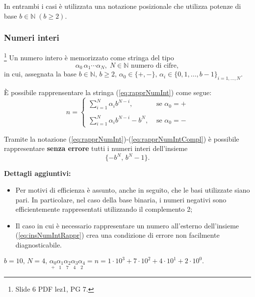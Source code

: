 In entrambi i casi è utilizzata una notazione posizionale che utilizza potenze di base $b\in\mathbb N\; (b\geq 2).$

\subsubsection{Numeri interi}\footnote{Slide 6 PDF lez1, PG 7.}
Un numero intero è memorizzato come stringa del tipo
\begin{equation}\label{eq:rapprNumInt}
	\alpha_0\,\alpha_1\cdots\alpha_N,\; N\in\mathbb N\text{ numero di cifre},
\end{equation}
in cui, assegnata la base $b\in\mathbb N,\, b\geq 2,\, \alpha_0\in\{+,-\},\, \alpha_i\in\{0,1,\hdots, b-1\}_{i=1,\hdots,N}.$

È possibile rapprensentare la stringa (\ref{eq:rapprNumInt}) come segue:
\begin{equation}\label{eq:rapprNumIntCompl}
	n=\begin{cases}
		\sum_{i=1}^N\alpha_i b^{N-i}, &\text{ se } \alpha_0=+\\
		\\
		\sum_{i=1}^N\alpha_i b^{N-i} -b^N, &\text{ se } \alpha_0=-
	\end{cases}
\end{equation}

Tramite la notazione (\ref{eq:rapprNumInt})-(\ref{eq:rapprNumIntCompl}) è possibile rappresentare \textbf{senza errore} tutti i numeri interi dell'insieme
\begin{equation}\label{eq:insNumIntRappr}
	\{-b^N,\,b^N-1\}.
\end{equation}

\textbf{Dettagli aggiuntivi:}
\begin{itemize}
	\item Per motivi di efficienza è assunto, anche in seguito, che le basi utilizzate siano pari. In particolare, nel caso della base binaria, i numeri negativi sono efficientemente rappresentati utilizzando il complemento 2;
	\item Il caso in cui è necessario rappresentare un numero all'esterno dell'insieme (\ref{eq:insNumIntRappr}) crea una condizione di errore non facilmente diagnosticabile. 
\end{itemize}

\begin{example}
	$b=10,\, N=4,\, \underset{+}{\alpha_0}\underset{1}{\alpha_1}\underset{7}{\alpha_2}\underset{4}{\alpha_3}\underset{2}{\alpha_4}=n=1\cdot 10^3+7\cdot 10^2+4\cdot 10^1+2\cdot 10^0.$
\end{example}

